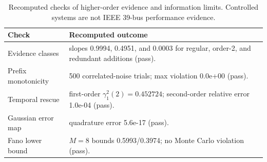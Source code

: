 \begin{table}[!t]
\caption{Recomputed checks of higher-order evidence and information limits. Controlled systems are not IEEE 39-bus performance evidence.}
\label{tab:supp-information-limit-checks}
\centering
\scriptsize
\begin{tabularx}{\columnwidth}{@{}p{}X@{}}
\toprule
Check & Recomputed outcome \\
\midrule
Evidence classes & slopes 0.9994, 0.4951, and 0.0003 for regular, order-2, and redundant additions (pass). \\
Prefix monotonicity & 500 correlated-noise trials; max violation 0.0e+00 (pass). \\
Temporal rescue & first-order $\gamma_1^2(2)=0.452724$; second-order relative error 1.0e-04 (pass). \\
Gaussian error map & quadrature error 5.6e-17 (pass). \\
Fano lower bound & $M=8$ bounds 0.5993/0.3974; no Monte Carlo violation (pass). \\
\bottomrule
\end{tabularx}
\end{table}
